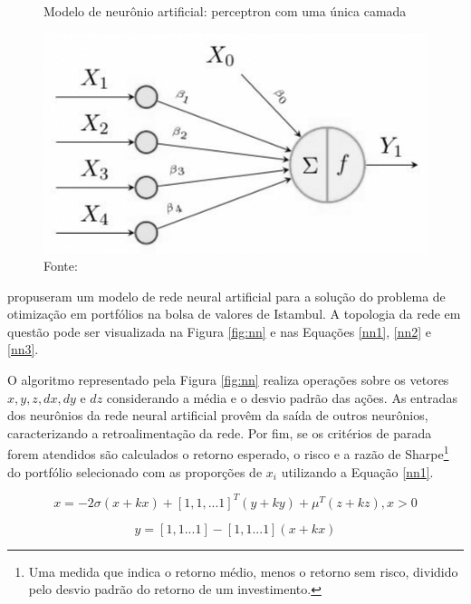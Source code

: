 \documentclass[11pt]{article}
\begin{document}
    \begin{figure}[H]
        \centering
        \caption{Modelo de neurônio artificial: perceptron com uma única camada}
        \includegraphics[scale=.6]{figuras/nn.jpg}
        \caption*{Fonte: }
        \label{fig:neural_network_perceptron}
    \end{figure}
    
    
     propuseram um modelo de rede neural artificial para a solução do problema de otimização em portfólios na bolsa de valores de Istambul. A topologia da rede em questão pode ser visualizada na Figura \ref{fig:nn} e nas Equações \ref{nn1}, \ref{nn2} e \ref{nn3}.
    
    O algoritmo representado pela Figura \ref{fig:nn} realiza operações sobre os vetores $x, y, z, dx, dy$ e $dz$ considerando a média e o desvio padrão das ações. As entradas dos neurônios da rede neural artificial provêm da saída de outros neurônios, caracterizando a retroalimentação da rede. Por fim, se os critérios de parada forem atendidos são calculados o retorno esperado, o risco e a razão de Sharpe\footnote{Uma medida que indica o retorno médio, menos o retorno sem risco, dividido pelo desvio padrão do retorno de um investimento.} do portfólio selecionado com as proporções de $x_i$ utilizando a Equação \ref{nn1}.
    
    \begin{equation} \label{nn1}
        x = -2\sigma(x + kx) + [1,1,...1]^T(y + ky) + \mu^T(z + kz), x > 0 
    \end{equation}
    
    \begin{equation} \label{nn2}
        y = [1,1...1] - [1,1...1](x + kx)
    \end{equation}
    
\end{document}
